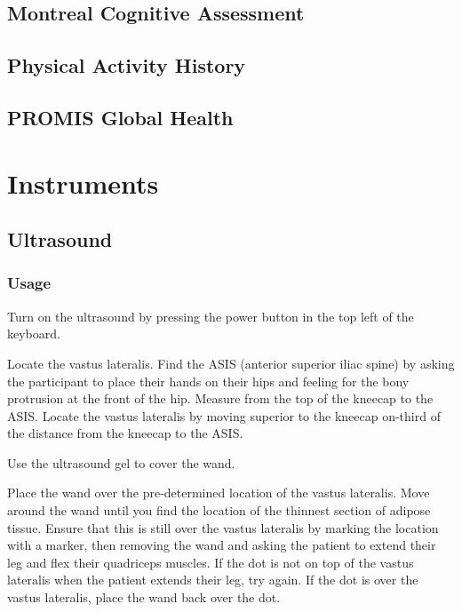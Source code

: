 \documentclass[
]{book}
\begin{document}
\hypertarget{Appendix-Surveys-moca}{%
\section{Montreal Cognitive Assessment}\label{Appendix-Surveys-moca}}

\hypertarget{Appendix-Surveys-pah}{%
\section{Physical Activity History}\label{Appendix-Surveys-pah}}

\hypertarget{Appendix-Surveys-promis}{%
\section{PROMIS Global Health}\label{Appendix-Surveys-promis}}

\hypertarget{Instruments}{%
\chapter{Instruments}\label{Instruments}}

\hypertarget{Appendix-Instruments-Ultrasound}{%
\section{Ultrasound}\label{Appendix-Instruments-Ultrasound}}

\hypertarget{Appendix-Instruments-Ultrasound-Usage}{%
\subsection{Usage}\label{Appendix-Instruments-Ultrasound-Usage}}

Turn on the ultrasound by pressing the power button in the top left of the keyboard.

Locate the vastus lateralis. Find the ASIS (anterior superior iliac spine) by asking the participant to place their hands on their hips and feeling for the bony protrusion at the front of the hip. Measure from the top of the kneecap to the ASIS. Locate the vastus lateralis by moving superior to the kneecap on-third of the distance from the kneecap to the ASIS.

Use the ultrasound gel to cover the wand.

Place the wand over the pre-determined location of the vastus lateralis. Move around the wand until you find the location of the thinnest section of adipose tissue. Ensure that this is still over the vastus lateralis by marking the location with a marker, then removing the wand and asking the patient to extend their leg and flex their quadriceps muscles. If the dot is not on top of the vastus lateralis when the patient extends their leg, try again. If the dot is over the vastus lateralis, place the wand back over the dot.
\end{document}
